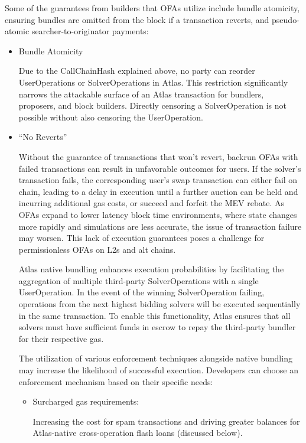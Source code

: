 \documentclass{article}
\begin{document}
Some of the guarantees from builders that OFAs utilize include bundle atomicity, ensuring bundles are omitted from the block if a transaction reverts, and pseudo-atomic searcher-to-originator payments:

\begin{itemize}
\item Bundle Atomicity

Due to the CallChainHash explained above, no party can reorder UserOperations or SolverOperations in Atlas. This restriction significantly narrows the attackable surface of an Atlas transaction for bundlers, proposers, and block builders. Directly censoring a SolverOperation is not possible without also censoring the UserOperation.

\item “No Reverts”

Without the guarantee of transactions that won't revert, backrun OFAs with failed transactions can result in unfavorable outcomes for users. If the solver’s transaction fails, the corresponding user’s swap transaction can either fail on chain, leading to a delay in execution until a further auction can be held and incurring additional gas costs, or succeed and forfeit the MEV rebate. As OFAs expand to lower latency block time environments, where state changes more rapidly and simulations are less accurate, the issue of transaction failure may worsen. This lack of execution guarantees poses a challenge for permissionless OFAs on L2s and alt chains.

Atlas native bundling enhances execution probabilities by facilitating the aggregation of multiple third-party SolverOperations with a single UserOperation. In the event of the winning SolverOperation failing, operations from the next highest bidding solvers will be executed sequentially in the same transaction. To enable this functionality, Atlas ensures that all solvers must have sufficient funds in escrow to repay the third-party bundler for their respective gas.

The utilization of various enforcement techniques alongside native bundling may increase the likelihood of successful execution. Developers can choose an enforcement mechanism based on their specific needs:
\begin{itemize}
\item Surcharged gas requirements:

Increasing the cost for spam transactions and driving greater balances for Atlas-native cross-operation flash loans (discussed below).


\end{itemize}
\end{itemize}
\end{document}
